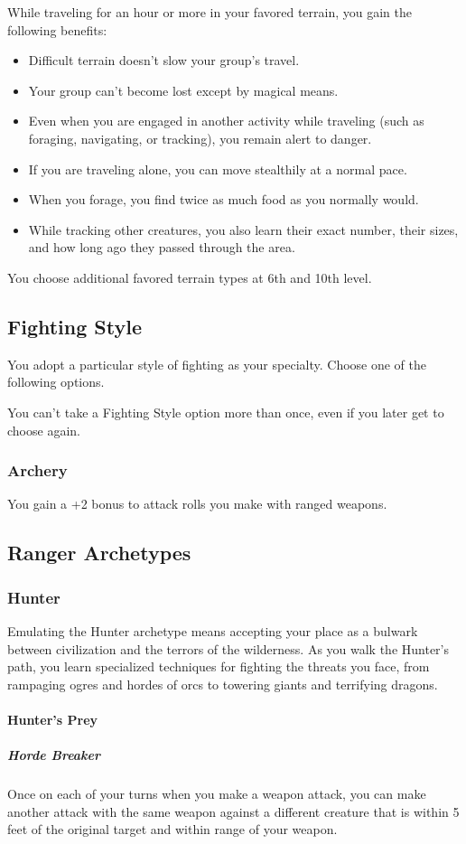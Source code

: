 \documentclass[letterpaper,openany,oneside,twocolumn]{book}
\begin{document}
While traveling for an hour or more in your favored terrain, you gain the following benefits:
\begin{itemize}
	\item Difficult terrain doesn't slow your group's travel.
	\item Your group can't become lost except by magical means.
	\item Even when you are engaged in another activity while traveling (such as foraging, navigating, or tracking), you remain alert to danger.
	\item If you are traveling alone, you can move stealthily at a normal pace.
	\item When you forage, you find twice as much food as you normally would.
	\item While tracking other creatures, you also learn their exact number, their sizes, and how long ago they passed through the area.
\end{itemize}
You choose additional favored terrain types at 6th and 10th level.

\subsection*{Fighting Style}
You adopt a particular style of fighting as your specialty. Choose one of the following options.

You can't take a Fighting Style option more than once, even if you later get to choose again.

\subsubsection*{Archery}
You gain a +2 bonus to attack rolls you make with ranged weapons.

\subsection*{Ranger Archetypes}
\subsubsection*{Hunter}
Emulating the Hunter archetype means accepting your place as a bulwark between civilization and the terrors of the wilderness. As you walk the Hunter's path, you learn specialized techniques for fighting the threats you face, from rampaging ogres and hordes of orcs to towering giants and terrifying dragons.

\paragraph*{Hunter's Prey}
\subparagraph*{Horde Breaker}
Once on each of your turns when you make a weapon attack, you can make another attack with the same weapon against a different creature that is within 5 feet of the original target and within range of your weapon.
\end{document}
